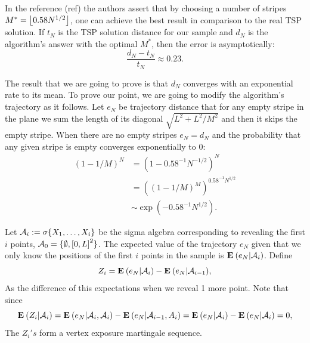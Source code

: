 In the reference (ref) the authors assert that by choosing a number of stripes $M^* = \left\lfloor0.58 N^{1/2}\right\rfloor$, one can achieve the best result in comparison to the real TSP solution. If $t_N$ is the TSP solution distance for our sample and $d_N$ is the algorithm's answer with the optimal $M^*$, then the error is asymptotically:
\[  \frac{d_N-t_N}{t_N} \approx 0.23.\] 

The result that we are going to prove is that $d_N$ converges with an exponential rate to its mean. To prove our point, we are going to modify the algorithm's trajectory as it follows. Let $e_N$ be trajectory distance that for any empty stripe in the plane we sum the length of its diagonal $\sqrt{L^2+ L^2/M^2}$ and then it skips the empty stripe. When there are no empty stripes $e_N = d_N$ and the probability that any given stripe is empty converges exponentially to 0:
\[ \begin{array}{rl}
    {(1- 1/M)}^N & = {(1- 0.58^{-1} N^{-1/2})}^N\\[1em]
    & = {\left({(1- 1/M)}^{M}\right)}^{0.58^{-1} N^{1/2}}\\[1em]
    &  \sim \exp(-0.58^{-1} N^{1/2}).
\end{array} \] 


Let $\mathcal{A}_i := \sigma\{X_1,\ldots,X_i\}$ be the sigma algebra corresponding to revealing the first $i$ points, $\mathcal{A}_0 = \{\emptyset, {[0,L]}^2\}$. The expected value of the trajectory $e_N$ given that we only know the positions of the first $i$ points in the sample is $\mathbf{E}\: (e_N | \mathcal{A}_i)$. Define
\[ Z_i = \mathbf{E}\: (e_N | \mathcal{A}_i) - \mathbf{E}\: (e_N | \mathcal{A}_{i-1}),  \]  
As the difference of this expectations when we reveal 1 more point. Note that since
\[ \mathbf{E}\:(Z_i | \mathcal{A}_i) =  \mathbf{E}\: (e_N | \mathcal{A}_i, \mathcal{A}_i) - \mathbf{E}\: (e_N | \mathcal{A}_{i-1}, A_i) = \mathbf{E}\: (e_N | \mathcal{A}_i) - \mathbf{E}\: (e_N | \mathcal{A}_i) = 0,\] 
The $Z_i's$ form a vertex exposure martingale sequence.

